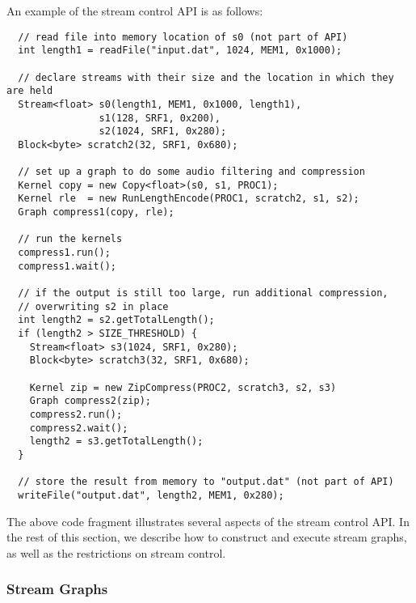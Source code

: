 An example of the stream control API is as follows:
{\small
\begin{verbatim}
  // read file into memory location of s0 (not part of API)
  int length1 = readFile("input.dat", 1024, MEM1, 0x1000);

  // declare streams with their size and the location in which they are held
  Stream<float> s0(length1, MEM1, 0x1000, length1), 
                s1(128, SRF1, 0x200), 
                s2(1024, SRF1, 0x280);
  Block<byte> scratch2(32, SRF1, 0x680);

  // set up a graph to do some audio filtering and compression
  Kernel copy = new Copy<float>(s0, s1, PROC1);
  Kernel rle  = new RunLengthEncode(PROC1, scratch2, s1, s2);
  Graph compress1(copy, rle);

  // run the kernels
  compress1.run();
  compress1.wait();

  // if the output is still too large, run additional compression, 
  // overwriting s2 in place
  int length2 = s2.getTotalLength();
  if (length2 > SIZE_THRESHOLD) {
    Stream<float> s3(1024, SRF1, 0x280);
    Block<byte> scratch3(32, SRF1, 0x680);
    
    Kernel zip = new ZipCompress(PROC2, scratch3, s2, s3)
    Graph compress2(zip);
    compress2.run();
    compress2.wait();
    length2 = s3.getTotalLength();
  }

  // store the result from memory to "output.dat" (not part of API)
  writeFile("output.dat", length2, MEM1, 0x280);
\end{verbatim}}
The above code fragment illustrates several aspects of the stream
control API.  In the rest of this section, we describe how to
construct and execute stream graphs, as well as the restrictions on
stream control.

\subsubsection{Stream Graphs}
\label{sec:streamgraph}

